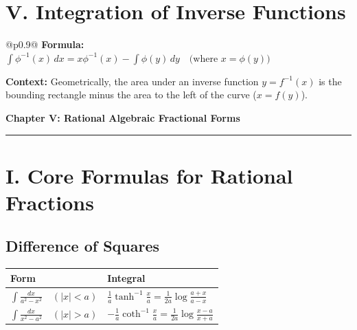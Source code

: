 \documentclass[11pt, a4paper]{article}
\begin{document}
\vspace{0.3cm}

\section*{\color{primary} V. Integration of Inverse Functions}

\begin{center}
\begin{tabular}{@{}p{0.9\columnwidth}@{}}
\toprule
\textbf{\color{accent}Formula:} $\int \phi^{-1}(x) \, dx = x \phi^{-1}(x) - \int \phi(y) \, dy \quad \text{(where } x = \phi(y)\text{)}$ \\
\bottomrule
\end{tabular}
\end{center}

\vspace{0.2cm}

\textbf{\color{accent}\small Context:} Geometrically, the area under an inverse function $y = f^{-1}(x)$ is the bounding rectangle minus the area to the left of the curve ($x = f(y)$).


\newpage

\begin{center}
    {\LARGE \bfseries \color{accent} Chapter V: Rational Algebraic Fractional Forms}\\
    \vspace{0.2cm}
    {\color{accent}\rule{0.55\linewidth}{0.8pt}}
\end{center}
\vspace{0.35cm}


\section*{\color{primary} I. Core Formulas for Rational Fractions}

\subsection*{\color{secondary} Difference of Squares}
\begin{center}
\begin{tabular}{@{}p{} p{}@{}}
\toprule
\textbf{Form} & \textbf{Integral} \\
\midrule
$\int \frac{dx}{a^2-x^2} \quad (|x|<a)$ & $\frac{1}{a} \tanh^{-1}\frac{x}{a} = \frac{1}{2a} \log \frac{a+x}{a-x}$ \\
$\int \frac{dx}{x^2-a^2} \quad (|x|>a)$ & $-\frac{1}{a} \coth^{-1}\frac{x}{a} = \frac{1}{2a} \log \frac{x-a}{x+a}$ \\
\bottomrule
\end{tabular}
\end{center}
\end{document}
